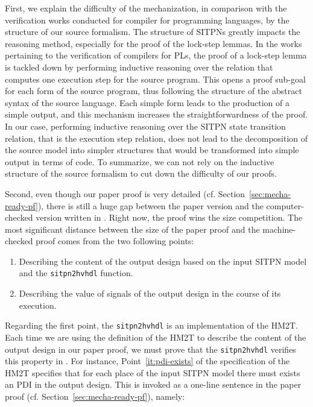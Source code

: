 \documentclass[pdflatex,sn-mathphys]{sn-jnl}%
\theoremstyle{thmstyleone}%
\theoremstyle{thmstyletwo}%
\theoremstyle{thmstylethree}%
\begin{document}
First, we explain the difficulty of the mechanization, in comparison
with the verification works conducted for compiler for programming
languages, by the structure of our source formalism.  The structure of
SITPNs greatly impacts the reasoning method, especially for the proof
of the lock-step lemmas. In the works pertaining to the verification
of compilers for PLs, the proof of a lock-step lemma is tackled down
by performing inductive reasoning over the relation that computes one
execution step for the source program. This opens a proof sub-goal for
each form of the source program, thus following the structure of the
abstract syntax of the source language. Each simple form leads to the
production of a simple output, and this mechanism increases the
straightforwardness of the proof. In our case, performing inductive
reasoning over the SITPN state transition relation, that is the
execution step relation, does not lead to the decomposition of the
source model into simpler structures that would be transformed into
simple output in terms of \vhdl{} code. To summarize, we can not rely
on the inductive structure of the source formalism to cut down the
difficulty of our proofs.

\bigskip

Second, even though our paper proof is very detailed
(cf. Section~\ref{sec:mecha-ready-pf}), there is still a huge gap
between the paper version and the computer-checked version written in
\coq{}.  Right now, the \coq{} proof wins the size competition. The
most significant distance between the size of the paper proof and the
machine-checked proof comes from the two following points:
\begin{enumerate}
  
\item Describing the content of the output design based on the
  input SITPN model and the \texttt{sitpn2hvhdl} function.
\item Describing the value of signals of the output design in the
  course of its execution.
\end{enumerate}

Regarding the first point, the \texttt{sitpn2hvhdl} is an \coq{}
implementation of the HM2T. Each time we are using the definition of
the HM2T to describe the content of the output design in our paper
proof, we must prove that the \texttt{sitpn2hvhdl} verifies this
property in \coq{}. For instance, Point~\ref{it:pdi-exists} of the
specification of the HM2T specifies that for each place of the input
SITPN model there must exists an PDI in the output design. This is
invoked as a one-line sentence in the
paper proof (cf. Section~\ref{sec:mecha-ready-pf}), namely:\\
\end{document}
